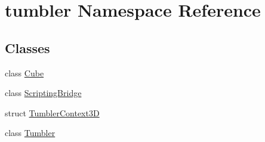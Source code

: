 \hypertarget{namespacetumbler}{
\section{tumbler Namespace Reference}
\label{namespacetumbler}
}
\subsection*{Classes}
\begin{DoxyCompactItemize}
\item 
class \hyperlink{classtumbler_1_1_cube}{Cube}
\item 
class \hyperlink{classtumbler_1_1_scripting_bridge}{ScriptingBridge}
\item 
struct \hyperlink{structtumbler_1_1_tumbler_context3_d}{TumblerContext3D}
\item 
class \hyperlink{classtumbler_1_1_tumbler}{Tumbler}
\end{DoxyCompactItemize}
